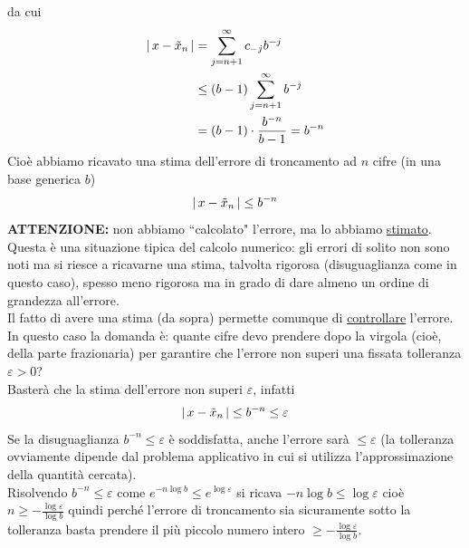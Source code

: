 da cui
\[ \begin{split}
    \lvert \, x - \Tilde{x}_n \,\rvert & = \sum_{j=n+1}^\infty c_{-j} b^{-j} \\
    & \le (b-1)\sum_{j=n+1}^{\infty} b^{-j} \\
    & = (b-1) \cdot \frac{b^{-n}}{b - 1} = b^{-n}
\end{split}\]
Cioè abbiamo ricavato una stima dell'errore di troncamento ad $n$ cifre (in una base generica $b$) \[ \lvert \, x - \Tilde{x}_n \,\rvert \le b^{-n} \]
\textbf{ATTENZIONE:} non abbiamo ``calcolato" l'errore, ma lo abbiamo \uline{stimato}. \\
Questa è una situazione tipica del calcolo numerico: gli errori di solito non sono noti ma si riesce a ricavarne una stima, talvolta rigorosa (disuguaglianza come in questo caso), spesso meno rigorosa ma in grado di dare almeno un ordine di grandezza all'errore. \\
Il fatto di avere una stima (da sopra) permette comunque di \uline{controllare} l'errore. \\
In questo caso la domanda è: quante cifre devo prendere dopo la virgola (cioè, della parte frazionaria) per garantire che l'errore non superi una fissata tolleranza $\varepsilon > 0$? \\
Basterà che la stima dell'errore non superi $\varepsilon$, infatti
\[ \lvert \, x - \Tilde{x}_n \,\rvert \le b^{-n} \le \varepsilon\]
Se la disuguaglianza $b^{-n} \le \varepsilon$ è soddisfatta, anche l'errore sarà $\le \varepsilon$ (la tolleranza ovviamente dipende dal problema applicativo in cui si utilizza l'approssimazione della quantità cercata).\\
Risolvendo $b^{-n} \le \varepsilon$ come $e^{-n \log b} \le e^{\log \varepsilon}$ si ricava $-n \log b \le \log \varepsilon$ cioè $n \ge - \frac{\log \varepsilon}{\log b}$ quindi perché l'errore di troncamento sia sicuramente sotto la tolleranza basta prendere il più piccolo numero intero $\ge - \frac{\log \varepsilon}{\log b}$.


